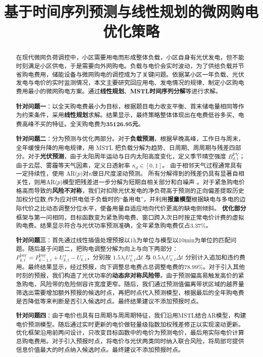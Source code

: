 \documentclass[withoutpreface,bwprint]{cumcmthesis}
\title{基于时间序列预测与线性规划的微网购电优化策略}  %
\begin{document}
\maketitle
\begin{abstract}

在现代微网负荷调控中，小区需要用电而形成整体负载，小区自身有光伏发电，但不能时刻满足小区供电，于是需要向外网购电。负载与电价会实时波动，为了供给负载并节省购电费用，储能设备与微网购电的调控成为了关键问题。依据某小区一年负载、光伏发电与电价的实时监测情况，本文主要研究回应用电、发电情况的规律、制定小区购电费用最小的微网购电方案。通过\textbf{线性规划}、\textbf{MSTL时间序列分解}等进行求解。

\textbf{针对问题一}：以全天购电费最小为目标，根据题目电力收支平衡、首末储电量相同等作为约束条件，采用\textbf{线性规划}求解。结果显示，最终策略整体体现出在电费低谷多买、电费高峰不买的特征。全天购电费为\textbf{35126.95元}。

\textbf{针对问题二}：分为预测与优化两部分。对于\textbf{负载预测}，根据早晚高峰，工作日与周末，全年缓慢升降的用电规律，用 MSTL 把负载分解为趋势、日周期、周周期与残差四部分。对于\textbf{光伏预测}，由于太阳周年运动与日内太阳高度变化，定义季节晴空强度 $B^{\mathrm{PV}}_{d,t}$；由于云层、雾霾等天气因素，定义日透射率 $\kappa_d\in[0,1]$。
由于相邻天气过程通常具有一定持续性，使用 AR($p$)对$\kappa$做日尺度滚动预测。
所有分解得到的残差仍具有显著自相关性，则用AR($p$)模型把残差进一步分解为短期自相关部分和白噪声
。对于紧急购电价格高而导致的\textbf{风险不对称}，我们对扣除光伏发电的净负荷高于预测的正向偏差提取历史加权分位数,作为应对供电低于负载时的“备用电”，并利用\textbf{报童模型}根据缺电与多电的边际代价之比动态调整分位水平，使备用量自适应地向代价更高的缺电侧倾斜。
\textbf{优化部分}框架与第一问相同，目标函数变为紧急购电费、窗口跨入次日时按正常电价计费的虚拟购电费。结果显示符合与光伏功率预测准确，全年紧急购电费仅占3.37\%。



\textbf{针对问题三}：首先通过线性插值处理预报以1h为单位与模型以10min为单位的匹配问题。随后基于问题二，把购电调整分解为向上与向下两部分：$P^{\mathrm{buy}}_{k,t}=P^{\mathrm{buy}}_{k-1,t}+U^{+}_{k,t}-U^{-}_{k,t}$，分别按 $1.5\lambda_t U^{+}_{k,t}\Delta t$ 与 $0.5\lambda_t U^{-}_{k,t}\Delta t$ 分别计入追加和违约费用。最终结果显示，经过预报，向下调整总电费占总调整电费的78.99\%。对于引入其他时刻的预报，我们构造了光伏功率的\textbf{动态非对称风险带}。由于预测偏高易触发高价的紧急购电，风险带的危险侧容许宽度更窄。随后，我们通过预测值偏离带状区域的越界量筛选出需要增加额外预报的候选时点，再把时点代入预测模型，根据最后的全年购电费是否降低等来判断是否引入候选时点。最终结果建议不添加预报时点。

\textbf{针对问题四}：由于电价也具有日周期与周周期特征，我们沿用MSTL结合AR模型，构建电价预测模型。随后通过实时更新的电价做轻量级指数加权残差修正以实现滚动更新。优化框架沿用前两问设计，只改变目标函数中的电价为预测电价，最后用实际电价计算总购电费用。对于引入预报时点，将电价与光伏两类同时纳入联合风险，将局部可提供信息价值最大的时点纳入候选时点。最终建议不添加预报时点。




\end{abstract}
\end{document}
